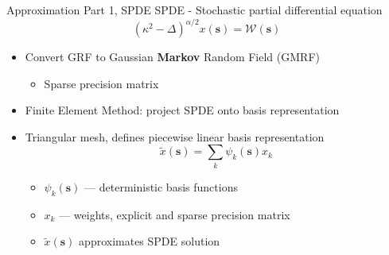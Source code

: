 \documentclass{beamer}
\begin{document}
\begin{frame}{Approximation Part 1, SPDE}
SPDE - Stochastic partial differential equation \citep{Lindgren2011}
$$ (\kappa^{2} - \Delta)^{\alpha/2}x(\pmb{s}) = \mathcal{W}(\pmb{s})$$
\begin{itemize}
\addtolength{\itemsep}{0.5\baselineskip}
\item Convert GRF to Gaussian {\bf Markov} Random Field (GMRF)
    \begin{itemize}
    \item Sparse precision matrix
    \end{itemize}
\item Finite Element Method: project SPDE onto basis representation
\item Triangular mesh, defines piecewise linear basis representation
$$ \tilde{x}(\pmb{s}) = \sum_{k} \psi_{k}(\pmb{s})x_{k}$$
                  \begin{itemize}
                  \addtolength{\itemsep}{0.5\baselineskip}
                  \item $\psi_{k}(\pmb{s})$ --- deterministic basis functions
                  \item $x_{k}$ --- weights, explicit and sparse precision matrix
                  \item $\tilde{x}(\pmb{s})$ approximates SPDE solution
                  \end{itemize}
\end{itemize}
\end{frame}
\end{document}
